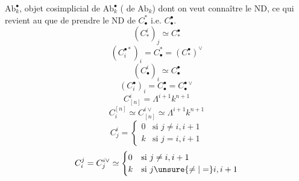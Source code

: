 { $\mathrm{Ab}_k^\bullet$, 
objet cosimplicial de $\mathrm{Ab}_k^\bullet$
( de $\mathrm{Ab}_k$) dont on veut connaître le ND,
ce qui revient au  que de prendre le ND
\uline{} de $C_\bullet^*$ i.e. $C_\bullet^\bullet$.
\[
(C_*^i)_j\simeq C_*^\bullet
\]
\[
(C_i^{\bullet *})_i=C_\bullet^*=(C_*^\bullet)^\vee
\]
\[
(C_\bullet^i)_i\simeq C_\bullet^\bullet
\]
\[
(C_i^\bullet)_i=C_\bullet^\bullet=C_\bullet^{\bullet\vee}
\]
\[
C_{[n]}^i=\Lambda^{i+1}k^{n+1}
\]
\[
C_i^{[n]}\simeq C_{[n]}^{i\vee}\simeq\Lambda^{i+1}k^{n+1}
\]
\[
C_j^i=\begin{cases}0&\text{si }j\ne i,i+1\\
k&\text{si }j=i,i+1\end{cases}
\]
\[
C_i^j=C_j^{i\vee}\simeq
\begin{cases}0&\text{si }j\ne i,i+1\\
k&\text{si }j\unsure{\ne|=}i,i+1\end{cases}
\]
}
